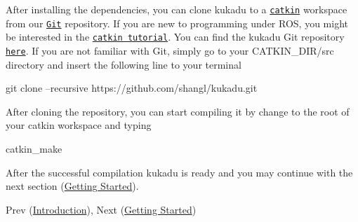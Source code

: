 After installing the dependencies, you can clone kukadu to a \href{http://wiki.ros.org/catkin}{\tt catkin} workspace from our \href{https://git-scm.com/}{\tt Git} repository. If you are new to programming under R\+OS, you might be interested in the \href{http://wiki.ros.org/catkin/Tutorials}{\tt catkin tutorial}. You can find the kukadu Git repository \href{https://github.com/shangl/kukadu}{\tt here}. If you are not familiar with Git, simply go to your C\+A\+T\+K\+I\+N\+\_\+\+D\+I\+R/src directory and insert the following line to your terminal 
\begin{DoxyCode}
git clone --recursive https:\textcolor{comment}{//github.com/shangl/kukadu.git}
\end{DoxyCode}
 After cloning the repository, you can start compiling it by change to the root of your catkin workspace and typing 
\begin{DoxyCode}
catkin\_make
\end{DoxyCode}
 After the successful compilation kukadu is ready and you may continue with the next section (\hyperlink{gettingstartedpage}{Getting Started}).

Prev (\hyperlink{introductionpage}{Introduction}), Next (\hyperlink{gettingstartedpage}{Getting Started}) 